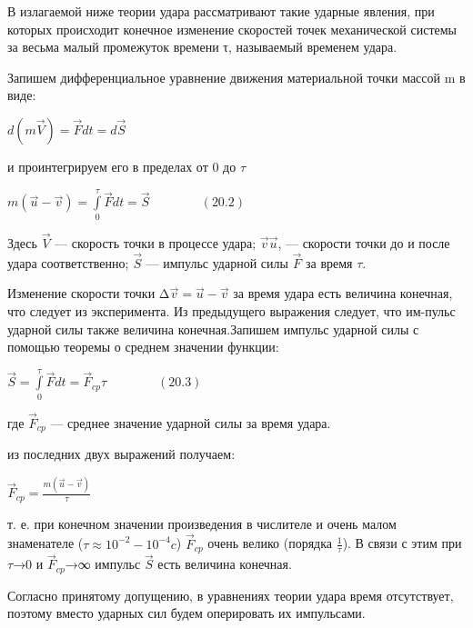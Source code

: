 {\begin{center}
В излагаемой ниже теории удара рассматривают такие ударные явления, при которых происходит конечное изменение скоростей точек механической системы за весьма малый промежуток времени τ, называемый временем удара.

Запишем дифференциальное уравнение  движения  материальной точки массой m в виде:

$ d(m\vec{V}) = \vec{F}dt = d\vec{S}$   

\par и проинтегрируем его в пределах от 0 до $\tau$

\par $ m(\vec{u}-\vec{v}) = \int\limits_0^\tau \vec{F}dt = \vec{S}   \qquad \qquad (20.2) $ 

\par  Здесь $\vec{V}$  — скорость точки в процессе удара; $\vec{v} \vec{u}$, — скорости точки до и после удара соответственно; $\vec{S}$  — импульс ударной силы $\vec{F}$ за время $\tau$.

\par Изменение скорости точки $∆\vec{v} = \vec{u} - \vec{v}$ за время удара есть величина конечная, что следует из эксперимента. Из предыдущего выражения следует, что им-пульс ударной силы также величина конечная.Запишем импульс ударной силы с помощью теоремы о среднем значении функции:

\par $\vec{S} = \int\limits_0^\tau \vec{F}dt = \vec{F}_{cp} \tau \qquad \qquad (20.3) $

\par где $\vec{F}_{cp}$ — среднее значение ударной силы за время удара.

\par из последних двух выражений получаем:

\par $\vec{F}_{cp}=\frac{m(\vec{u}-\vec{v})}{\tau}$

\par т. е. при конечном значении произведения в числителе и очень малом знаменателе ($\tau \approx 10^{-2} - 10^{-4} c$)   $\vec{F}_{cp}$ очень велико (порядка $\frac{1}{\tau}$). В связи с этим при $\tau$→0 и  $\vec{F}_{cp}$→∞ импульс $\vec{S}$ есть величина конечная.

\par Согласно принятому допущению, в уравнениях теории удара время отсутствует, поэтому вместо ударных сил будем оперировать их импульсами.


\end{center}}
